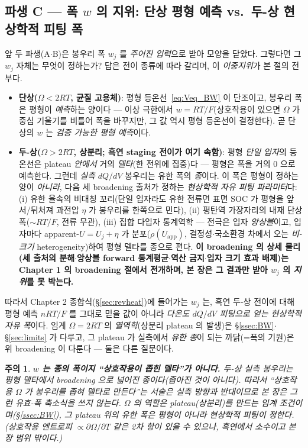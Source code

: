 \documentclass[11pt,a4paper]{article}
\newtheorem*{warnbox}{주의}
\newcommand{\app}{\mathrm{app}}
\begin{document}
\subsection{파생 C — 폭 $w$ 의 지위: 단상 평형 예측 vs.\ 두-상 현상학적 피팅 폭}\label{ssec:weff}
앞 두 파생(A$\cdot$B)은 봉우리 폭 $w_j$ 를 \emph{주어진 입력}으로 받아 모양을 닫았다. 그렇다면 그 $w_j$ 자체는
무엇이 정하는가? 답은 전이 종류에 따라 갈리며, 이 \emph{이중지위}가 본 절의 전부다.
\begin{itemize}[leftmargin=1.4em,itemsep=2pt]
\item \textbf{단상($\Omega<2RT$, 균질 고용체)}: 평형 등온선~\eqref{eq:Veq_BW} 이 단조이고, 봉우리 폭은 평형이
\emph{예측}하는 양이다 — 이상 극한에서 $w=RT/F$(상호작용이 있으면 $\Omega$ 가 중심 기울기를 비틀어 폭을
바꾸지만, 그 값 역시 평형 등온선이 결정한다). 곧 단상의 $w$ 는 \emph{검증 가능한 평형 예측}이다.
\item \textbf{두-상($\Omega>2RT$, 상분리; 흑연 staging 전이가 여기 속함)}: 평형 \emph{단일 입자}의 등온선은
plateau \emph{안에서} 거의 \emph{델타}(한 전위에 집중)다 — 평형은 폭을 거의 0 으로 예측한다. 그런데 \emph{실측}
$dQ/dV$ 봉우리는 유한 폭의 \emph{종}이다. 이 폭은 평형이 정하는 양이 \emph{아니라}, 다음 세 broadening 출처가
정하는 \emph{현상학적 자유 피팅 파라미터}다: (i) 유한 율속의 비대칭 꼬리(단일 입자라도 유한 전류면 표면 SOC
가 평형을 앞서/뒤처져 과전압 $\eta$ 가 봉우리를 한쪽으로 민다), (ii) 평탄역 가장자리의 내재 단상 폭($\sim RT/F$,
전류 무관), (iii) 집합 다입자 통계역학 — 전극은 입자 \emph{앙상블}이고, 입자마다 apparent-$U=U_j+\eta$ 가
분포($\rho(U_\app)$, 결정성$\cdot$국소환경 차에서 오는 \emph{비-크기} heterogeneity)하여 평형 델타를 종으로
편다. \textbf{이 broadening 의 상세 물리(세 출처의 분해$\cdot$앙상블 forward 통계평균$\cdot$역산 금지$\cdot$입자
크기 효과 배제)는 Chapter 1 의 broadening 절에서 전개하며, 본 장은 그 결과만 받아 $w_j$ 의 \emph{지위}를 못
박는다.}
\end{itemize}
따라서 Chapter 2 종합식(\S\ref{sec:revheat})에 들어가는 $w_j$ 는, 흑연 두-상 전이에 대해 평형 예측
$nRT/F$ 를 그대로 믿을 값이 아니라 \emph{다온도 $dQ/dV$ 피팅으로 얻는 현상학적 자유 폭}이다. 임계
$\Omega=2RT$ 의 \emph{열역학}(상분리 plateau 의 발생)은 \S\ref{ssec:BW}$\cdot$\S\ref{sec:limits} 가 다루고, 그
plateau 가 실측에서 \emph{유한 종}이 되는 까닭(=폭의 기원)은 위 broadening 이 다룬다 — 둘은 다른 질문이다.
\begin{warnbox}
\textbf{$w$ 는 종의 폭이지 ``상호작용이 좁힌 델타''가 아니다.} 두-상 실측 봉우리는 평형 델타에서 broadening 으로
\emph{넓어진} 종이다(좁아진 것이 아니다). 따라서 ``상호작용 $\Omega$ 가 봉우리를 좁혀 델타로 만든다''는 서술은
\emph{실측 방향과 반대}이므로 본 장은 그런 유효-폭 축소식을 쓰지 않는다. $\Omega$ 의 역할은 plateau(상분리)를
\emph{만드는} 임계 조건이며(\S\ref{ssec:BW}), 그 plateau 위의 \emph{유한 폭}은 평형이 아니라 현상학적 피팅이
정한다. (상호작용 엔트로피 $\propto\partial\Omega/\partial T$ 같은 2차 항이 있을 수 있으나, 흑연에서 소수이고
본 장 범위 밖이다.)
\end{warnbox}
\end{document}
